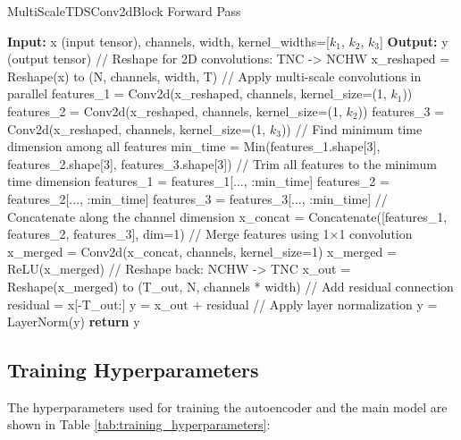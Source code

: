 \begin{algorithm}[h]
    \caption{MultiScaleTDSConv2dBlock Forward Pass}
    \begin{algorithmic}[1]
        \STATE \textbf{Input:} x (input tensor), channels, width, kernel\_widths=[$k_1$, $k_2$, $k_3$]
        \STATE \textbf{Output:} y (output tensor)
        \STATE // Reshape for 2D convolutions: TNC -> NCHW
        \STATE x\_reshaped = Reshape(x) to (N, channels, width, T)
        \STATE // Apply multi-scale convolutions in parallel
        \STATE features\_1 = Conv2d(x\_reshaped, channels, kernel\_size=(1, $k_1$))
        \STATE features\_2 = Conv2d(x\_reshaped, channels, kernel\_size=(1, $k_2$))
        \STATE features\_3 = Conv2d(x\_reshaped, channels, kernel\_size=(1, $k_3$))
        \STATE // Find minimum time dimension among all features
        \STATE min\_time = Min(features\_1.shape[3], features\_2.shape[3], features\_3.shape[3])
        \STATE // Trim all features to the minimum time dimension
        \STATE features\_1 = features\_1[..., :min\_time]
        \STATE features\_2 = features\_2[..., :min\_time]
        \STATE features\_3 = features\_3[..., :min\_time]
        \STATE // Concatenate along the channel dimension
        \STATE x\_concat = Concatenate([features\_1, features\_2, features\_3], dim=1)
        \STATE // Merge features using 1×1 convolution
        \STATE x\_merged = Conv2d(x\_concat, channels, kernel\_size=1)
        \STATE x\_merged = ReLU(x\_merged)
        \STATE // Reshape back: NCHW -> TNC
        \STATE x\_out = Reshape(x\_merged) to (T\_out, N, channels * width)
        \STATE // Add residual connection
        \STATE residual = x[-T\_out:]
        \STATE y = x\_out + residual
        \STATE // Apply layer normalization
        \STATE y = LayerNorm(y)
        \STATE \textbf{return} y
    \end{algorithmic}
    \label{alg:multi_scale_tds_conv2d_block}
\end{algorithm}

\subsection{Training Hyperparameters}

The hyperparameters used for training the autoencoder and the main model are shown in Table \ref{tab:training_hyperparameters}:

